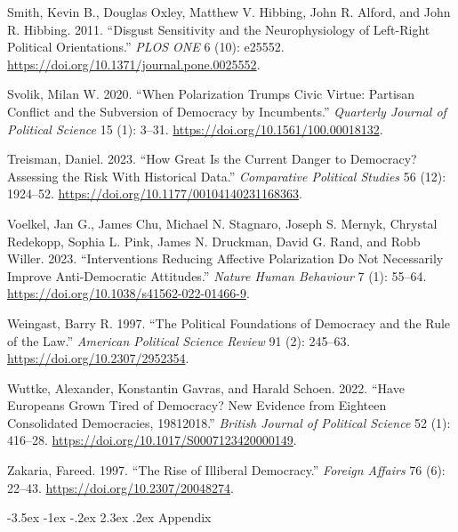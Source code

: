 \documentclass[
  10pt,
  letterpaper,
  DIV=11,
  numbers=noendperiod]{scrartcl}
\makeatletter
\newlength{\cslhangindent}
\newenvironment{CSLReferences}[2] %
 {\begin{list}{}{%
  \setlength{\itemindent}{0pt}
  \setlength{\leftmargin}{0pt}
  \setlength{\parsep}{0pt}
  \ifodd #1
   \setlength{\leftmargin}{\cslhangindent}
   \setlength{\itemindent}{-1\cslhangindent}
  \fi
  \setlength{\itemsep}{#2\baselineskip}}}
 {\end{list}}
\renewcommand\section{\@startsection{section}{1}{\z@}%
  {-3.5ex \@plus -1ex \@minus -.2ex}%
  {2.3ex \@plus.2ex}%
  {\normalfont\Large\bfseries\centering}}
\makeatother
\begin{document}
\begin{CSLReferences}{1}{0}
Smith, Kevin B., Douglas Oxley, Matthew V. Hibbing, John R. Alford, and
John R. Hibbing. 2011. {``Disgust Sensitivity and the Neurophysiology of
Left-Right Political Orientations.''} \emph{PLOS ONE} 6 (10): e25552.
\url{https://doi.org/10.1371/journal.pone.0025552}.

Svolik, Milan W. 2020. {``When Polarization Trumps Civic Virtue:
Partisan Conflict and the Subversion of Democracy by Incumbents.''}
\emph{Quarterly Journal of Political Science} 15 (1): 3--31.
\url{https://doi.org/10.1561/100.00018132}.

Treisman, Daniel. 2023. {``How Great Is the Current Danger to Democracy?
Assessing the Risk With Historical Data.''} \emph{Comparative Political
Studies} 56 (12): 1924--52.
\url{https://doi.org/10.1177/00104140231168363}.

Voelkel, Jan G., James Chu, Michael N. Stagnaro, Joseph S. Mernyk,
Chrystal Redekopp, Sophia L. Pink, James N. Druckman, David G. Rand, and
Robb Willer. 2023. {``Interventions Reducing Affective Polarization Do
Not Necessarily Improve Anti-Democratic Attitudes.''} \emph{Nature Human
Behaviour} 7 (1): 55--64.
\url{https://doi.org/10.1038/s41562-022-01466-9}.

Weingast, Barry R. 1997. {``The Political Foundations of Democracy and
the Rule of the Law.''} \emph{American Political Science Review} 91 (2):
245--63. \url{https://doi.org/10.2307/2952354}.

Wuttke, Alexander, Konstantin Gavras, and Harald Schoen. 2022. {``Have
Europeans Grown Tired of Democracy? New Evidence from Eighteen
Consolidated Democracies, 1981{\textendash}2018.''} \emph{British
Journal of Political Science} 52 (1): 416--28.
\url{https://doi.org/10.1017/S0007123420000149}.

Zakaria, Fareed. 1997. {``The Rise of Illiberal Democracy.''}
\emph{Foreign Affairs} 76 (6): 22--43.
\url{https://doi.org/10.2307/20048274}.

\end{CSLReferences}

\newpage{}

\section{Appendix}\label{appendix}
\end{document}
